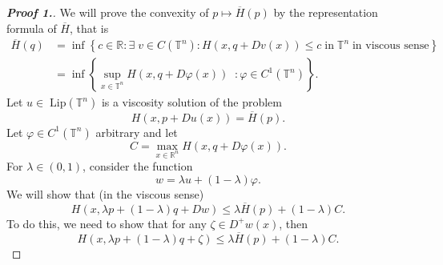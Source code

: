 \documentclass[12pt, oneside]{amsart}  	%
\begin{document}
\begin{proof}[\textbf{Proof 1.}]
We will prove the convexity of $p\longmapsto\overline{H}(p)$ by the representation formula of $\overline{H}$, that is
\begin{align*}
\overline{H}(q) &= \inf \left\lbrace c\in \mathbb{R}: \exists\;v\in C(\mathbb{T}^n): H(x,q+Dv(x))\leq c\;\text{in}\;\mathbb{T}^n\;\text{in viscous sense}\right\rbrace \\
	            &= \inf\left\lbrace \sup_{x\in \mathbb{T}^n} H(x,q+D\varphi(x))\;\;:\varphi\in C^1(\mathbb{T}^n)\right\rbrace.
\end{align*}
Let $u\in\;\text{Lip}(\mathbb{T}^n)$ is a viscosity solution of the problem
\begin{equation}\label{Epp}
H(x,p+Du(x)) = \overline{H}(p) \tag{$E_p$}.
\end{equation}
Let $\varphi\in C^1(\mathbb{T}^n)$ arbitrary and let
\begin{equation*}
C = \max_{x\in \mathbb{R}^n} H(x,q+D\varphi(x)).
\end{equation*}
For $\lambda\in (0,1)$, consider the function
\begin{equation*}
w = \lambda u + (1-\lambda) \varphi.
\end{equation*}
We will show that (in the viscous sense)
\begin{equation}\label{Elambda p + 1-lambda q}
H\left(x,\lambda p +(1-\lambda)q+ Dw\right) \leq \lambda \overline{H}(p) + (1-\lambda)C .
\end{equation}
To do this, we need to show that for any $\zeta\in D^+w(x)$, then
\begin{equation*}
H\left(x,\lambda p +(1-\lambda)q+ \zeta\right) \leq \lambda \overline{H}(p) + (1-\lambda)C.
\end{equation*}
\vspace*{0.1cm}

\end{proof}
\end{document}
